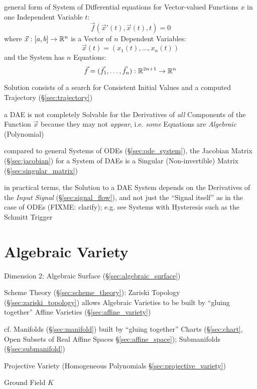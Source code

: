 general form of System of Differential equations for Vector-valued Functions
$x$ in one Independent Variable $t$:
\[
  \vec{f}(\vec{x}'(t), \vec{x}(t), t) = 0
\]
where $\vec{x} : [a,b] \rightarrow \mathbb{R}^n$ is a Vector of $n$ Dependent
Variables:
\[
  \vec{x}(t) = (x_1(t), \ldots, x_n(t))
\]
and the System has $n$ Equations:
\[
  \vec{f} = (\vec{f}_1, \ldots, \vec{f}_n) : \mathbb{R}^{2n+1} \rightarrow \mathbb{R}^n
\]

Solution consists of a search for Consistent Initial Values and a computed
Trajectory (\S\ref{sec:trajectory})

a DAE is not completely Solvable for the Derivatives of \emph{all} Components
of the Function $\vec{x}$ because they may not \emph{appear}, i.e. \emph{some}
Equations are \emph{Algebraic} (Polynomial)

compared to general Systems of ODEs (\S\ref{sec:ode_system}), the Jacobian
Matrix (\S\ref{sec:jacobian}) for a System of DAEs is a Singular
(Non-invertible) Matrix (\S\ref{sec:singular_matrix})

in practical terms, the Solution to a DAE System depends on the Derivatives of
the \emph{Input Signal} (\S\ref{sec:signal_flow}), and not just the ``Signal
itself'' as in the case of ODEs
(FIXME: clarify); e.g. see Systems with Hysteresis such as the Schmitt Trigger



\section{Algebraic Variety}\label{sec:algebraic_variety}

Dimension 2: Algebraic Surface (\S\ref{sec:algebraic_surface})

Scheme Theory (\S\ref{sec:scheme_theory}): Zariski Topology
(\S\ref{sec:zariski_topology}) allows Algebraic Varieties to be built by
``gluing together'' Affine Varieties (\S\ref{sec:affine_variety})

cf. Manifolds (\S\ref{sec:manifold}) built by ``gluing together'' Charts
(\S\ref{sec:chart}, Open Subsets of Real Affine Spaces
\S\ref{sec:affine_space}); Submanifolds (\S\ref{sec:submanifold})

\fist Projective Variety (Homogeneous Polynomials
\S\ref{sec:projective_variety})

Ground Field $K$

